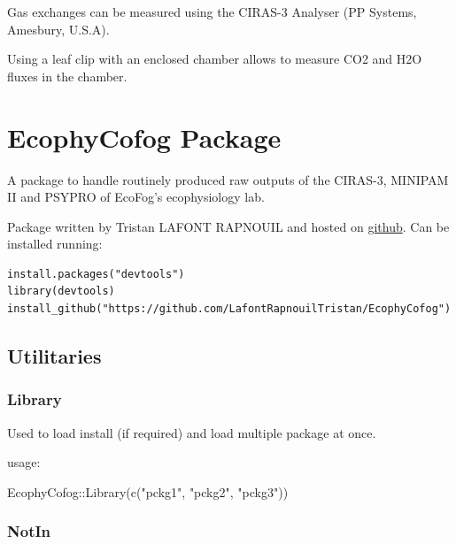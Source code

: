 \documentclass[
  12pt,
  american,
  a4paper,
  extrafontsizes,onecolumn,openright
  ]{memoir}
\newenvironment{Shaded}{\begin{snugshade}}{\end{snugshade}}
\newcommand{\FunctionTok}[1]{\textcolor[rgb]{0.00,0.00,0.00}{#1}}
\newcommand{\NormalTok}[1]{#1}
\newcommand{\SpecialCharTok}[1]{\textcolor[rgb]{0.00,0.00,0.00}{#1}}
\newcommand{\StringTok}[1]{\textcolor[rgb]{0.31,0.60,0.02}{#1}}
\begin{document}
Gas exchanges can be measured using the CIRAS-3 Analyser (PP Systems, Amesbury, U.S.A).

Using a leaf clip with an enclosed chamber allows to measure CO2 and H2O fluxes in the chamber.

\hypertarget{ecophycofog-package}{%
\chapter{EcophyCofog Package}\label{ecophycofog-package}}

A package to handle routinely produced raw outputs of the CIRAS-3, MINIPAM II and PSYPRO of EcoFog's ecophysiology lab.

Package written by Tristan LAFONT RAPNOUIL and hosted on \href{https://github.com/LafontRapnouilTristan/EcophyCofog}{github}.
Can be installed running:

\begin{verbatim}
install.packages("devtools")
library(devtools)
install_github("https://github.com/LafontRapnouilTristan/EcophyCofog")
\end{verbatim}

\hypertarget{utilitaries}{%
\section{Utilitaries}\label{utilitaries}}

\hypertarget{library}{%
\subsection{Library}\label{library}}

Used to load install (if required) and load multiple package at once.

usage:

\scriptsize

\begin{Shaded}
\begin{Highlighting}[]
\NormalTok{EcophyCofog}\SpecialCharTok{::}\FunctionTok{Library}\NormalTok{(}\FunctionTok{c}\NormalTok{(}\StringTok{"pckg1"}\NormalTok{, }\StringTok{"pckg2"}\NormalTok{, }\StringTok{"pckg3"}\NormalTok{))}
\end{Highlighting}
\end{Shaded}

\normalsize

\hypertarget{notin}{%
\subsection{NotIn}\label{notin}}
\end{document}
